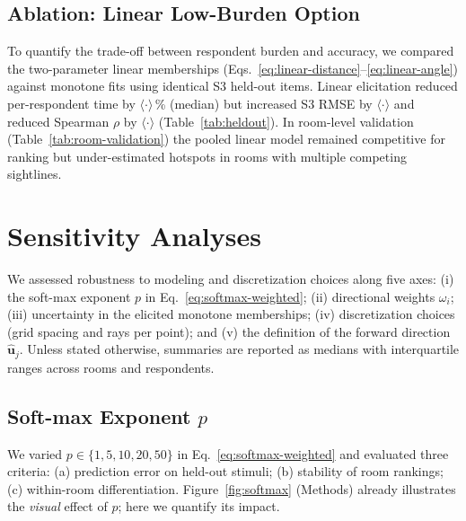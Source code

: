 \documentclass[final,3p,times,review]{elsarticle}
\begin{document}
\subsection{Ablation: Linear Low-Burden Option}
To quantify the trade-off between respondent burden and accuracy, we compared the two-parameter linear memberships (Eqs.~\ref{eq:linear-distance}--\ref{eq:linear-angle}) against monotone fits using identical S3 held-out items. Linear elicitation reduced per-respondent time by $\langle \cdot \rangle$\,\% (median) but increased S3 RMSE by $\langle \cdot \rangle$ and reduced Spearman $\rho$ by $\langle \cdot \rangle$ (Table~\ref{tab:heldout}). In room-level validation (Table~\ref{tab:room-validation}) the pooled linear model remained competitive for ranking but under-estimated hotspots in rooms with multiple competing sightlines.

\section{Sensitivity Analyses}
\label{sec:sensitivity}
We assessed robustness to modeling and discretization choices along five axes: (i) the soft-max exponent $p$ in Eq.~\eqref{eq:softmax-weighted}; (ii) directional weights $\omega_i$; (iii) uncertainty in the elicited monotone memberships; (iv) discretization choices (grid spacing and rays per point); and (v) the definition of the forward direction $\hat{\mathbf{u}}_j$. Unless stated otherwise, summaries are reported as medians with interquartile ranges across rooms and respondents.

\subsection{Soft-max Exponent $p$}
We varied $p\in\{1,5,10,20,50\}$ in Eq.~\eqref{eq:softmax-weighted} and evaluated three criteria: (a) prediction error on held-out stimuli; (b) stability of room rankings; (c) within-room differentiation. Figure~\ref{fig:softmax} (Methods) already illustrates the \emph{visual} effect of $p$; here we quantify its impact.
\end{document}
